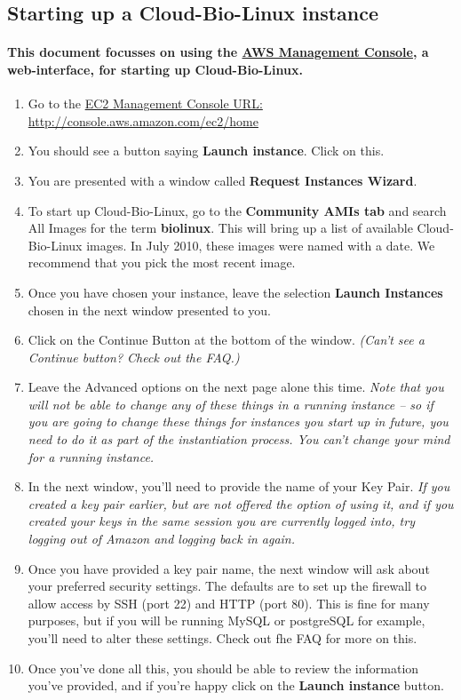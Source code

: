 \subsection{Starting up a Cloud-Bio-Linux instance}
\paragraph{This document focusses on using the \href{http://console.aws.amazon.com/ec2/home}{AWS Management Console}, a web-interface, for starting up Cloud-Bio-Linux.}
\begin{enumerate}
\item Go to the \href{http://console.aws.amazon.com/ec2/home}{EC2 Management Console URL: http://console.aws.amazon.com/ec2/home}
\item You should see a button saying \textbf{Launch instance}. Click on this. 
\item You are presented with a window called \textbf{Request Instances Wizard}. 
\item To start up Cloud-Bio-Linux, go to the \textbf{Community AMIs tab} and search All Images for the term \textbf{biolinux}. This will bring up a list of available Cloud-Bio-Linux images.  In July 2010, these images were named with a date. We recommend that you pick the most recent image.
\item Once you have chosen your instance, leave the selection \textbf{Launch Instances} chosen in the next window presented to you.
\item Click on the Continue Button at the bottom of the window. \emph{(Can't see a Continue button? Check out the FAQ.)}
\item Leave the Advanced options on the next page alone this time. \emph{Note that you will not be able to change any of these things in a running instance – so if you are going to change these things for instances you start up in future, you need to do it as part of the instantiation process. You can't change your mind for a running instance.}
\item In the next window, you'll need to provide the name of your Key Pair. \emph{If you created a key pair earlier, but are not offered the option of using it, and if you created your keys in the same session you are currently logged into, try logging out of Amazon and logging back in again.}
\item Once you have provided a key pair name, the next window will ask about your preferred security settings. The defaults are to set up the firewall to allow access by SSH (port 22) and HTTP (port 80). This is fine for many purposes, but if you will be running MySQL or postgreSQL for example, you'll need to alter these settings. Check out fhe FAQ for more on this.
\item Once you've done all this, you should be able to review the information you've provided, and if you're happy click on the \textbf{Launch instance} button.
\end{enumerate}

